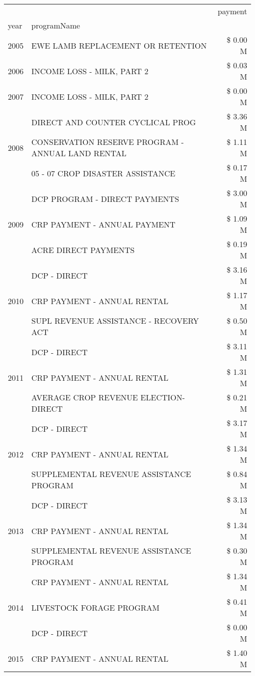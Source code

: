 \begin{tabular}{llr}
\toprule
 &  & payment \\
year & programName &  \\
\midrule
2005 & EWE LAMB REPLACEMENT OR RETENTION & \$ 0.00 M \\
\cline{1-3}
2006 & INCOME LOSS - MILK, PART 2 & \$ 0.03 M \\
\cline{1-3}
2007 & INCOME LOSS - MILK, PART 2 & \$ 0.00 M \\
\cline{1-3}
\multirow[t]{3}{*}{2008} & DIRECT AND COUNTER CYCLICAL PROG & \$ 3.36 M \\
 & CONSERVATION RESERVE PROGRAM - ANNUAL LAND RENTAL & \$ 1.11 M \\
 & 05 - 07 CROP DISASTER ASSISTANCE & \$ 0.17 M \\
\cline{1-3}
\multirow[t]{3}{*}{2009} & DCP PROGRAM - DIRECT PAYMENTS & \$ 3.00 M \\
 & CRP PAYMENT - ANNUAL PAYMENT & \$ 1.09 M \\
 & ACRE DIRECT PAYMENTS & \$ 0.19 M \\
\cline{1-3}
\multirow[t]{3}{*}{2010} & DCP - DIRECT & \$ 3.16 M \\
 & CRP PAYMENT - ANNUAL RENTAL & \$ 1.17 M \\
 & SUPL REVENUE ASSISTANCE - RECOVERY ACT & \$ 0.50 M \\
\cline{1-3}
\multirow[t]{3}{*}{2011} & DCP - DIRECT & \$ 3.11 M \\
 & CRP PAYMENT - ANNUAL RENTAL & \$ 1.31 M \\
 & AVERAGE CROP REVENUE ELECTION-DIRECT & \$ 0.21 M \\
\cline{1-3}
\multirow[t]{3}{*}{2012} & DCP - DIRECT & \$ 3.17 M \\
 & CRP PAYMENT - ANNUAL RENTAL & \$ 1.34 M \\
 & SUPPLEMENTAL REVENUE ASSISTANCE PROGRAM & \$ 0.84 M \\
\cline{1-3}
\multirow[t]{3}{*}{2013} & DCP - DIRECT & \$ 3.13 M \\
 & CRP PAYMENT - ANNUAL RENTAL & \$ 1.34 M \\
 & SUPPLEMENTAL REVENUE ASSISTANCE PROGRAM & \$ 0.30 M \\
\cline{1-3}
\multirow[t]{3}{*}{2014} & CRP PAYMENT - ANNUAL RENTAL & \$ 1.34 M \\
 & LIVESTOCK FORAGE PROGRAM & \$ 0.41 M \\
 & DCP - DIRECT & \$ 0.00 M \\
\cline{1-3}
\multirow[t]{3}{*}{2015} & CRP PAYMENT - ANNUAL RENTAL & \$ 1.40 M \\

\end{tabular}
